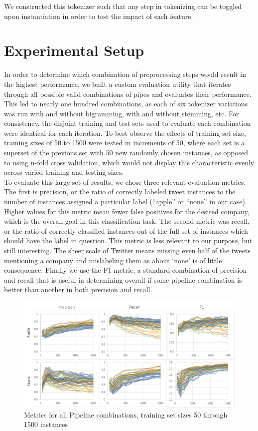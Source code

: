 \documentclass[letterpaper]{article}
\begin{document}
We constructed this tokenizer such that any step in tokenizing can be toggled upon instantiation in order to test the impact of each feature.\\

\section{Experimental Setup}
In order to determine which combination of preprocessing steps would result in the highest performance, we built a custom evaluation utility that iterates through all possible valid combinations of pipes and evaluates their performance. This led to nearly one hundred combinations, as each of six tokenizer variations was run with and without bigramming, with and without stemming, etc. For consistency, the disjoint training and test sets used to evaluate each combination were identical for each iteration. To best observe the effects of training set size, training sizes of 50 to 1500 were tested in increments of 50, where each set is a superset of the previous set with 50 new randomly chosen instances, as opposed to using n-fold cross validation, which would not display this characteristic evenly across varied training and testing sizes. \\

To evaluate this large set of results, we chose three relevant evaluation metrics. The first is precision, or the ratio of correctly labeled tweet instances to the number of instances assigned a particular label (``apple'' or ``none'' in our case). Higher values for this metric mean fewer false positives for the desired company, which is the overall goal in this classification task. The second metric was recall, or the ratio of correctly classified instances out of the full set of instances which should have the label in question. This metric is less relevant to our purpose, but still interesting. The sheer scale of Twitter means missing even half of the tweets mentioning a company and mislabeling them as about `none' is of little consequence. Finally we use the F1 metric, a standard combination of precision and recall that is useful in determining overall if some pipeline combination is better than another in both precision and recall.

\begin{figure}[t!]
\centering
\includegraphics[width=\textwidth]{img/all-with-headings}
\caption{Metrics for all Pipeline combinations, training set sizes 50 through 1500 instances}
\label{fig:chart_all}
\end{figure}
\end{document}
